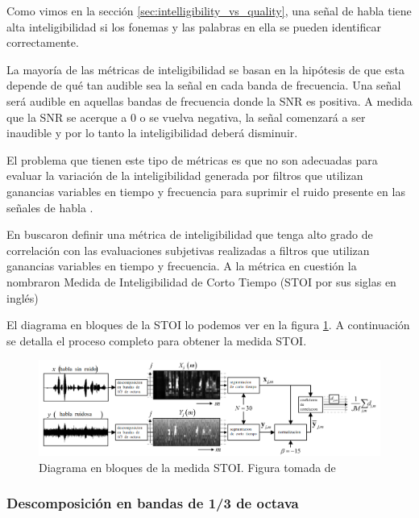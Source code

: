 Como vimos en la sección \ref{sec:intelligibility_vs_quality}, una señal de habla tiene alta inteligibilidad si los fonemas y las palabras en ella se pueden identificar correctamente.

La mayoría de las métricas de inteligibilidad se basan en la hipótesis de que esta depende de qué tan audible sea la señal en cada banda de frecuencia. Una señal será audible en aquellas bandas de frecuencia donde la SNR es positiva. A medida que la SNR se acerque a 0 o se vuelva negativa, la señal comenzará a ser inaudible y por lo tanto la inteligibilidad deberá disminuir.  

El problema que tienen este tipo de métricas es que no son adecuadas para evaluar la variación de la inteligibilidad generada por filtros que utilizan ganancias variables en tiempo y frecuencia para suprimir el ruido presente en las señales de habla \cite{an_algorithm_for_intelligibility_prediction_of_time_frequency_weighted_noisy_speech}. 

En \cite{an_algorithm_for_intelligibility_prediction_of_time_frequency_weighted_noisy_speech} buscaron definir una métrica de inteligibilidad que tenga alto grado de correlación con las evaluaciones subjetivas realizadas a filtros que utilizan ganancias variables en tiempo y frecuencia. A la métrica en cuestión la nombraron Medida de Inteligibilidad de Corto Tiempo (STOI por sus siglas en inglés)

El diagrama en bloques de la STOI lo podemos ver en la figura \ref{fig:ch4_stoi_schematic}. A continuación se detalla el proceso completo para obtener la medida STOI.

\begin{figure}
	\centering
	\centerline{\includegraphics[scale=0.4]{images/ch4/stoi_schematic.png}}
	\caption{Diagrama en bloques de la medida STOI. Figura tomada de \cite{an_algorithm_for_intelligibility_prediction_of_time_frequency_weighted_noisy_speech}}
	\label{fig:ch4_stoi_schematic}
\end{figure}

\subsubsection{Descomposición en bandas de 1/3 de octava}


